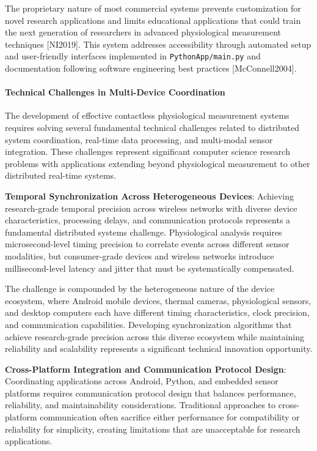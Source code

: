 \documentclass[11pt,a4paper]{article}
\begin{document}
The proprietary nature of most commercial systems prevents customization for novel
research applications and limits
educational applications that could train the next generation of researchers in
advanced physiological measurement
techniques [NI2019].  This system addresses accessibility through automated setup and
user-friendly interfaces
implemented in \texttt{PythonApp/main.py} and documentation following
software engineering best
practices [McConnell2004].

\paragraph{Technical Challenges in Multi-Device Coordination}

The development of effective contactless physiological measurement systems requires
solving several fundamental
technical challenges related to distributed system coordination, real-time data
processing, and multi-modal sensor
integration.  These challenges represent significant computer science research
problems with applications extending
beyond physiological measurement to other distributed real-time systems.

\textbf{Temporal Synchronization Across Heterogeneous Devices}: Achieving research-grade temporal precision across wireless
networks with diverse device characteristics, processing delays, and communication
protocols represents a fundamental
distributed systems challenge.  Physiological analysis requires microsecond-level
timing precision to correlate events
across different sensor modalities, but consumer-grade devices and wireless networks
introduce millisecond-level latency
and jitter that must be systematically compensated.

The challenge is compounded by the heterogeneous nature of the device ecosystem,
where Android mobile devices, thermal
cameras, physiological sensors, and desktop computers each have different timing
characteristics, clock precision, and
communication capabilities.  Developing synchronization algorithms that achieve
research-grade precision across this
diverse ecosystem while maintaining reliability and scalability represents a
significant technical innovation
opportunity.

\textbf{Cross-Platform Integration and Communication Protocol Design}: Coordinating applications across Android, Python, and
embedded sensor platforms requires communication protocol design that
balances performance, reliability,
and maintainability considerations.  Traditional approaches to cross-platform
communication often sacrifice either
performance for compatibility or reliability for simplicity, creating limitations
that are unacceptable for research
applications.
\end{document}
